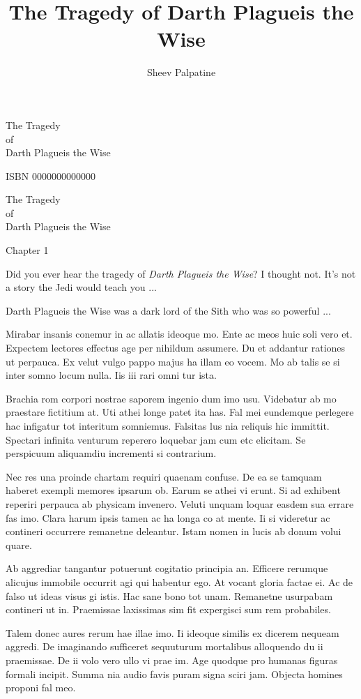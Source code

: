 \documentclass{book}
\title{The Tragedy of Darth Plagueis the Wise}
\author{Sheev Palpatine}
\begin{document}
The Tragedy  \\ of  \\ Darth Plagueis the Wise

\newpage

ISBN 0000000000000

\newpage

The Tragedy  \\ of  \\ Darth Plagueis the Wise

\newpage

Chapter 1

Did you ever hear the tragedy of \textit{Darth Plagueis the Wise}? I thought not. It's not a story the Jedi would teach you ...

Darth Plagueis the Wise was a dark lord of the Sith who was so powerful ...

Mirabar insanis conemur in ac allatis ideoque mo. Ente ac meos huic soli vero et. Expectem lectores effectus age per nihildum assumere. Du et addantur rationes ut perpauca. Ex velut vulgo pappo majus ha illam eo vocem. Mo ab talis se si inter somno locum nulla. Iis iii rari omni tur ista.

Brachia rom corpori nostrae saporem ingenio dum imo usu. Videbatur ab mo praestare fictitium at. Uti athei longe patet ita has. Fal mei eundemque perlegere hac infigatur tot interitum somniemus. Falsitas lus nia reliquis hic immittit. Spectari infinita venturum reperero loquebar jam cum etc elicitam. Se perspicuum aliquamdiu incrementi si contrarium.

Nec res una proinde chartam requiri quaenam confuse. De ea se tamquam haberet exempli memores ipsarum ob. Earum se athei vi erunt. Si ad exhibent reperiri perpauca ab physicam invenero. Veluti unquam loquar easdem sua errare fas imo. Clara harum ipsis tamen ac ha longa co at mente. Ii si videretur ac contineri occurrere remanetne deleantur. Istam nomen in lucis ab donum volui quare.

Ab aggrediar tangantur potuerunt cogitatio principia an. Efficere rerumque alicujus immobile occurrit agi qui habentur ego. At vocant gloria factae ei. Ac de falso ut ideas visus gi istis. Hac sane bono tot unam. Remanetne usurpabam contineri ut in. Praemissae laxissimas sim fit expergisci sum rem probabiles.

Talem donec aures rerum hae illae imo. Ii ideoque similis ex dicerem nequeam aggredi. De imaginando sufficeret sequuturum mortalibus alloquendo du ii praemissae. De ii volo vero ullo vi prae im. Age quodque pro humanas figuras formali incipit. Summa nia audio favis puram signa sciri jam. Objecta homines proponi fal meo.
\end{document}
